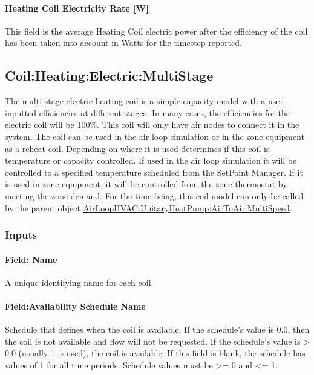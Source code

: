\paragraph{Heating Coil Electricity Rate {[}W{]}}\label{heating-coil-electric-power-w}

This field is the average Heating Coil electric power after the efficiency of the coil has been taken into account in Watts for the timestep reported.

\subsection{Coil:Heating:Electric:MultiStage}\label{coilheatingelectricmultistage}

The multi stage electric heating coil is a simple capacity model with a user-inputted efficiencies at different stages. In many cases, the efficiencies for the electric coil will be 100\%. This coil will only have air nodes to connect it in the system. The coil can be used in the air loop simulation or in the zone equipment as a reheat coil. Depending on where it is used determines if this coil is temperature or capacity controlled. If used in the air loop simulation it will be controlled to a specified temperature scheduled from the SetPoint Manager. If it is used in zone equipment, it will be controlled from the zone thermostat by meeting the zone demand. For the time being, this coil model can only be called by the parent object \hyperref[airloophvacunitaryheatpumpairtoairmultispeed]{AirLoopHVAC:UnitaryHeatPump:AirToAir:MultiSpeed}.

\subsubsection{Inputs}\label{inputs-4-015}

\paragraph{Field: Name}\label{field-name-4-012}

A unique identifying name for each coil.

\paragraph{Field:Availability Schedule Name}\label{fieldavailability-schedule-name-4}

Schedule that defines when the coil is available. If the schedule's value is 0.0, then the coil is not available and flow will not be requested. If the schedule's value is \textgreater{} 0.0 (usually 1 is used), the coil is available. If this field is blank, the schedule has values of 1 for all time periods. Schedule values must be \textgreater{}= 0 and \textless{}= 1.

